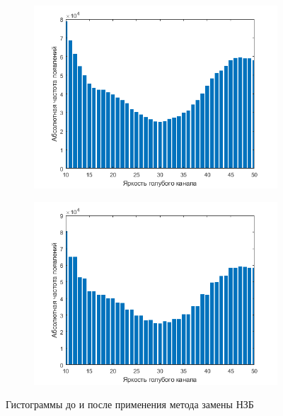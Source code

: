 \begin{figure}
     \centering
     \begin{subfigure}{\textwidth}
         \centering
         \includegraphics[width=\textwidth]{include/graphics/lsb_subst_before}
     \end{subfigure}
     \hfill
     \begin{subfigure}{\textwidth}
         \centering
         \includegraphics[width=\textwidth]{include/graphics/lsb_subst_after}
     \end{subfigure}
     \caption{Гистограммы до и после применения метода замены НЗБ}
     \label{fig:LSBHists}
\end{figure}


